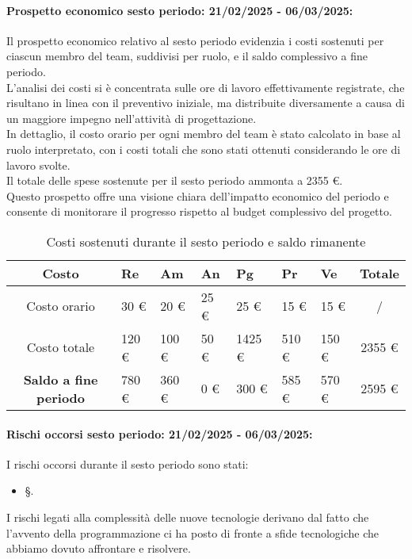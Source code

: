 \paragraph{Prospetto economico sesto periodo: 21/02/2025 - 06/03/2025: }
Il prospetto economico relativo al sesto periodo evidenzia i costi sostenuti per ciascun membro del team, suddivisi per ruolo, e il saldo complessivo a fine periodo.\\
L'analisi dei costi si è concentrata sulle ore di lavoro effettivamente registrate, che risultano in linea con il preventivo iniziale, ma distribuite diversamente a causa di un maggiore impegno nell'attività di progettazione.\\
In dettaglio, il costo orario per ogni membro del team è stato calcolato in base al ruolo interpretato, con i costi totali che sono stati ottenuti considerando le ore di lavoro svolte.\\
Il totale delle spese sostenute per il sesto periodo ammonta a 2355 \euro.\\
Questo prospetto offre una visione chiara dell'impatto economico del periodo e consente di monitorare il progresso rispetto al budget complessivo del progetto.
\begin{table}[!h]
    \centering
    \renewcommand{\arraystretch}{1.5}
    \begin{tabularx}{\textwidth}{|c|X|X|X|X|X|X|c|}\hline
    \rowcolor[HTML]{FFD700} 
    \textbf{Costo} & \textbf{Re} & \textbf{Am} & \textbf{An} & \textbf{Pg} & \textbf{Pr} & \textbf{Ve} & \textbf{Totale} \\ \hline
    Costo orario & 30 \euro & 20 \euro & 25 \euro & 25 \euro & 15 \euro & 15 \euro & /  \\ \hline
    Costo totale & 120 \euro & 100 \euro & 50 \euro & 1425 \euro & 510 \euro & 150 \euro & 2355 \euro \\ \hline
    \rowcolor[HTML]{FFD700} 
    \textbf{Saldo a fine periodo}  & 780 \euro & 360 \euro & 0 \euro & 300 \euro & 585 \euro & 570 \euro & 2595 \euro \\ \hline
    \end{tabularx}
    \caption{Costi sostenuti durante il sesto periodo e saldo rimanente}
\end{table}

\newpage
\paragraph{Rischi occorsi sesto periodo: 21/02/2025 - 06/03/2025: }
I rischi occorsi durante il sesto periodo sono stati:
\begin{itemize}
    \item \S{}.
\end{itemize}
I rischi legati alla complessità delle nuove tecnologie derivano dal fatto che l’avvento della programmazione ci ha posto di fronte a sfide tecnologiche che abbiamo dovuto affrontare e risolvere.

